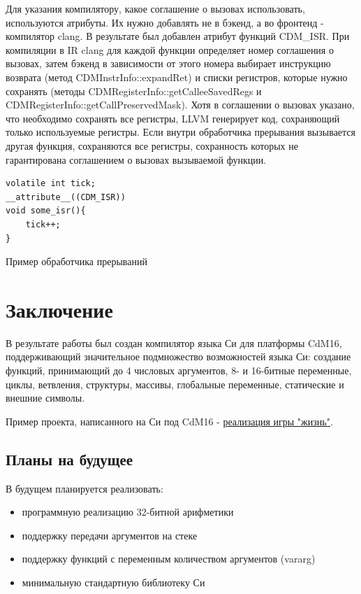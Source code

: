 \documentclass[a4paper,14pt]{extarticle}
\begin{document}
Для указания компилятору, какое соглашение о вызовах использовать, используются атрибуты. Их нужно добавлять не в бэкенд, а во фронтенд - компилятор clang. В результате был добавлен атрибут функций CDM\_ISR. При компиляции в IR clang для каждой функции определяет номер соглашения о вызовах, затем бэкенд в зависимости от этого номера выбирает инструкцию возврата (метод CDMInstrInfo::expandRet) и списки регистров, которые нужно сохранять (методы CDMRegisterInfo::getCalleeSavedRegs и CDMRegisterInfo::getCallPreservedMask). Хотя в соглашении о вызовах указано, что необходимо сохранять все регистры, LLVM генерирует код, сохраняющий только используемые регистры. Если внутри обработчика прерывания вызывается другая функция, сохраняются все регистры, сохранность которых не гарантирована соглашением о вызовах вызываемой функции.
\begin{listing}[h!]
	\begin{verbatim}
volatile int tick;
__attribute__((CDM_ISR))
void some_isr(){
	tick++;
}
	\end{verbatim}
	\caption{Пример обработчика прерываний}
\end{listing}


\pagebreak
\section{Заключение}

В результате работы был создан компилятор языка Си для платформы CdM16, поддерживающий значительное подмножество возможностей языка Си: создание функций, принимающий до 4 числовых аргументов, 8- и 16-битные переменные, циклы, ветвления, структуры, массивы, глобальные переменные, статические и внешние символы.

Пример проекта, написанного на Си под CdM16 - \href{https://github.com/leadpogrommer/llvm-project-cdm/tree/backend/cdm/llvm/test_cdm/life_multifile}{реализация игры "жизнь"}.

\subsection{Планы на будущее}

В будущем планируется реализовать:
\begin{itemize}
	\item программную реализацию 32-битной арифметики
	\item поддержку передачи аргументов на стеке
	\item поддержку функций с переменным количеством аргументов (vararg)
	\item минимальную стандартную библиотеку Си
\end{itemize}


\pagebreak
\printbibliography
{}




	
\end{document}
